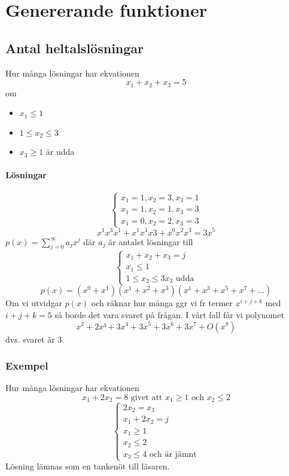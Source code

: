 \chapter{Genererande funktioner}

\section{Antal heltalslösningar}
Hur många lösningar har ekvationen $$
	x_1+x_2+x_3=5
$$ om \begin{itemize}
	\item $x_1\leq 1$
	\item $1\leq x_2\leq3$
	\item $x_3\geq1$ är udda
\end{itemize}

\subsubsection{Lösningar}
$$
	\begin{cases}
		x_1=1,x_2=3, x_3=1 \\
		x_1=1,x_2=1,x_3=3  \\
		x_1=0,x_2=2,x_3=3
	\end{cases}
$$$$
	x^1x^3x^1+x^1x^1x 3+x^0x^2x^3=3x^5
$$
$p(x)=\sum_{j=0}^\infty a_jx^j$ där $a_j$ är antalet lösningar till $$
	\begin{cases}
		x_1+x_2+x_3=j \\
		x_1\leq1      \\
		1\leq x_2\leq3
		x_3\text{ udda}
	\end{cases}
$$
$$
	p(x)=(x^0+x^1)(x^1+x^2+x^3)(x^1+x^3+x^5+x^7+\ldots)
$$
Om vi utvidgar $p(x)$ och räknar hur många ggr vi fr termer $x^{i+j+k}$ med $i+j+k=5$ så borde det vara svaret på frågan. I vårt fall får vi polynomet $$
	x^2+2x ³+3x^4+3x^5+3x^6+3x^7+O(x^8)
$$dvs. svaret är 3.
\subsection {Exempel}
Hur många lösningar har ekvationen $$
	x_1+2x_2=8 \text{ givet att }x_1\geq1 \text{ och }x_2\leq 2
$$$$
	\begin{cases}
		2x_2=x_3   \\
		x_1+2x_2=j \\
		x_1\geq1   \\
		x_2\leq2   \\
		x_3\leq4 \text{ och är jämnt}
	\end{cases}
$$
Lösning lämnas som en tankenöt till läsaren.\\
